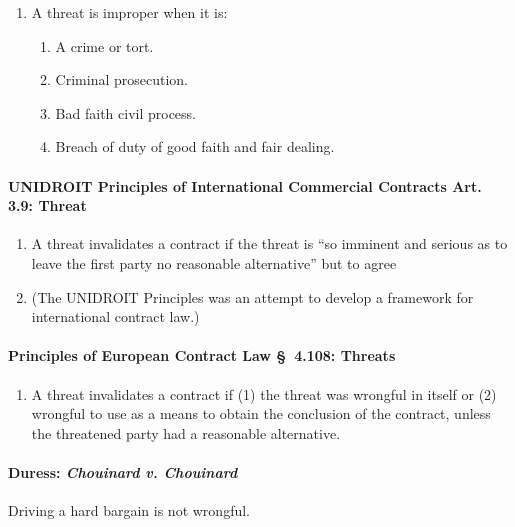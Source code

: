 \begin{enumerate}
    \item A threat is improper when it is:
    \begin{enumerate}
        \item A crime or tort.
        \item Criminal prosecution.
        \item Bad faith civil process.
        \item Breach of duty of good faith and fair dealing.
    \end{enumerate}
\end{enumerate}

\paragraph{UNIDROIT Principles of International Commercial Contracts Art.  
3.9: Threat}

\begin{enumerate}
    \item A threat invalidates a contract if the threat is ``so imminent and 
    serious as to leave the first party no reasonable alternative'' but to 
    agree
    \item (The UNIDROIT Principles was an attempt to develop a framework for 
    international contract law.)
\end{enumerate}

\paragraph{Principles of European Contract Law \S\ 4.108: Threats}

\begin{enumerate}
    \item A threat invalidates a contract if (1) the threat was wrongful in 
    itself or (2) wrongful to use as a means to obtain the conclusion of the 
    contract, unless the threatened party had a reasonable alternative.
\end{enumerate}

\paragraph{Duress: \emph{Chouinard v. Chouinard}}

Driving a hard bargain is not wrongful.

